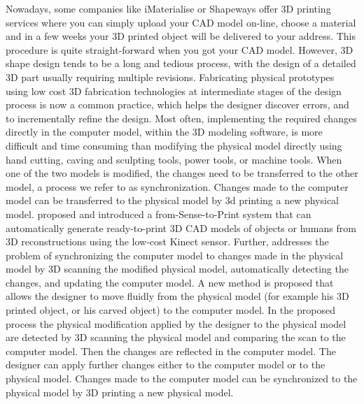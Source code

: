 Nowadays, some companies like iMaterialise or Shapeways offer 3D printing services where you can simply upload your CAD model on-line, choose a material and in a few weeks your 3D printed object will be delivered to your address. This procedure is quite straight-forward when you got your CAD model. However, 3D shape design tends to be a long and tedious process, with the design of a detailed 3D part usually requiring multiple revisions. Fabricating physical prototypes using low cost 3D fabrication technologies at intermediate stages of the design process is now a common practice, which helps the designer discover errors, and to incrementally reﬁne the design. Most often, implementing the required changes directly in the computer model, within the 3D modeling software, is more difficult and time consuming than modifying the physical model directly using hand cutting, caving and sculpting tools, power tools, or machine tools. When one of the two models is modified, the changes need to be transferred to the other model, a process we refer to as synchronization. Changes made to the computer model can be transferred to the physical model by 3d printing a new physical model. \cite{3DPrintingFrom3DSensing13} proposed and introduced a from-Sense-to-Print system that can automatically generate ready-to-print 3D CAD models of objects or humans from 3D reconstructions using the low-cost Kinect sensor. Further, \cite{3DModelingForPrinting15} addresses the problem of synchronizing the computer model to changes made in the physical model by 3D scanning the modified physical model, automatically detecting the changes, and updating the computer model. A new method is proposed that allows the designer to move fluidly from the physical model (for example his 3D printed object, or his carved object) to the computer model. In the proposed process the physical modification applied by the designer to the physical model are detected by 3D scanning the physical model and comparing the scan to the computer model. Then the changes are reflected in the computer model. The designer can apply further changes either to the computer model or to the physical model. Changes made to the computer model can be synchronized to the physical model by 3D printing a new physical model.


